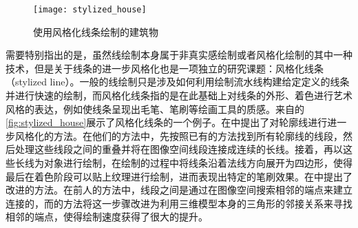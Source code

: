 
\begin{figure}[tbh]
    \centering
    \texttt{[image: stylized\_house]}
    \caption{\label{fig:stylized_house}
    使用风格化线条绘制的建筑物}
\end{figure}

需要特别指出的是，虽然线绘制本身属于非真实感绘制或者风格化绘制的其中一种技术，但是关于线条的进一步风格化也是一项独立的研究课题：风格化线条（stylized line）。一般的线绘制只是涉及如何利用绘制流水线构建给定定义的线条并进行快速的绘制，而风格化线条指的是在此基础上对线条的外形、着色进行艺术风格的表达，例如使线条呈现出毛笔、笔刷等绘画工具的质感。来自\cite{northrup2000artistic}的\autoref{fig:stylized_house}展示了风格化线条的一个例子。\citeauthor{northrup2000artistic}在\cite{northrup2000artistic}中提出了对轮廓线进行进一步风格化的方法。在他们的方法中，先按照已有的方法找到所有轮廓线的线段，然后处理这些线段之间的重叠并将在图像空间线段连接成连续的长线。接着，再以这些长线为对象进行绘制，在绘制的过程中将线条沿着法线方向展开为四边形，使得最后在着色阶段可以贴上纹理进行绘制，进而表现出特定的笔刷效果。\citeauthor{isenberg2002stylizing}在\cite{isenberg2002stylizing}中提出了改进的方法。在前人的方法中，线段之间是通过在图像空间搜索相邻的端点来建立连接的，而\citeauthor{isenberg2002stylizing}的方法将这一步骤改进为利用三维模型本身的三角形的邻接关系来寻找相邻的端点，使得绘制速度获得了很大的提升。

